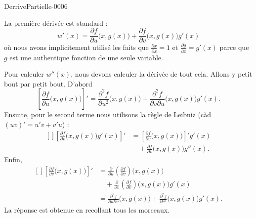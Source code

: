 
\begin{corrige}{DerrivePartielle-0006}

	La première dérivée est standard :
	\begin{equation}
		w'(x)=\frac{ \partial f }{ \partial u }\big( x,g(x) \big)+\frac{ \partial f }{ \partial v }\Big( x,g(x) \Big)g'(x)
	\end{equation}
	où nous avons implicitement utilisé les faits que $\frac{ \partial x }{ \partial x }=1$ et $\frac{ \partial g }{ \partial x }=g'(x)$ parce que $g$ est une authentique fonction de une seule variable.

	Pour calculer $w''(x)$, nous devons calculer la dérivée de tout cela. Allons y petit bout par petit bout. D'abord
	\begin{equation}
		\left[ \frac{ \partial f }{ \partial u }\Big( x,g(x) \Big) \right]'=\frac{ \partial^2f  }{ \partial u^2 }\Big( x,g(x) \Big)+\frac{ \partial^2f }{ \partial v\partial u }\Big( x,g(x) \Big)g'(x).
	\end{equation}
	Ensuite, pour le second terme nous utilisons la règle de Leibniz (càd $(uv)'=u'v+v'u$) :
	\begin{equation}
		\begin{aligned}[]
			\left[  \frac{ \partial f }{ \partial v }\Big( x,g(x) \Big)g'(x) \right]' & =\left[ \frac{ \partial f }{ \partial v }\Big( x,g(x) \Big) \right]'g'(x) \\
			                                                                          & \quad +\frac{ \partial f }{ \partial v }\Big( x,g(x) \Big)g''(x).
		\end{aligned}
	\end{equation}
	Enfin,
	\begin{equation}
		\begin{aligned}[]
			\left[ \frac{ \partial f }{ \partial v }\Big( x,g(x) \Big) \right]' & =\frac{ \partial  }{ \partial u }\left( \frac{ \partial f }{ \partial v } \right)\Big( x,g(x) \Big)                           \\
			                                                                    & \quad +\frac{ \partial  }{ \partial v }\left( \frac{ \partial f }{ \partial v } \right)\Big( x,g(x) \Big)g'(x)                \\
			                                                                    & =\frac{ \partial^2f  }{ \partial u\partial v }\Big( x,g(x) \Big)+\frac{ \partial^2f }{ \partial v^2 }\Big( x,g(x) \Big)g'(x).
		\end{aligned}
	\end{equation}
	La réponse est obtenue en recollant tous les morceaux.


\end{corrige}
